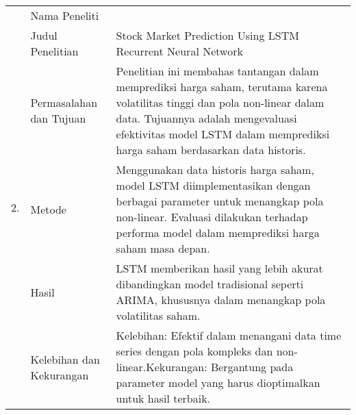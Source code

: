 \begin{center}
\begin{longtable}{| m{1cm} | m{3cm}| p{8cm} |}
    \hline
		\multirow[t]{6}{*}{2.}             & Nama Peneliti                          & \cite{moghar2020stock} \\
		\cline{2-3}
		                                   & Judul Penelitian                       & Stock Market Prediction Using LSTM Recurrent Neural Network \\
		\cline{2-3}
		                                   & Permasalahan dan Tujuan                & Penelitian ini membahas tantangan dalam memprediksi harga saham, terutama karena volatilitas tinggi dan pola non-linear dalam data. Tujuannya adalah mengevaluasi efektivitas model LSTM dalam memprediksi harga saham berdasarkan data historis. \\
		\cline{2-3}
		                                   & Metode                                 & Menggunakan data historis harga saham, model LSTM diimplementasikan dengan berbagai parameter untuk menangkap pola non-linear. Evaluasi dilakukan terhadap performa model dalam memprediksi harga saham masa depan. \\
		\cline{2-3}
		                                   & Hasil                                  & LSTM memberikan hasil yang lebih akurat dibandingkan model tradisional seperti ARIMA, khususnya dalam menangkap pola volatilitas saham. \\
		\cline{2-3}
		                                   & Kelebihan dan Kekurangan               & Kelebihan: Efektif dalam menangani data time series dengan pola kompleks dan non-linear.\newline Kekurangan: Bergantung pada parameter model yang harus dioptimalkan untuk hasil terbaik. \\


\end{longtable}
\end{center}
